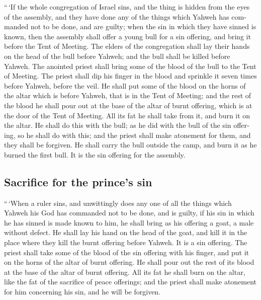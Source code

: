 \begin{paracol}{2}
\begin{otherlanguage}{english}
 ``\,`If the whole congregation of Israel sins, and the
thing is hidden from the eyes of the assembly, and they have done any of
the things which Yahweh has commanded not to be done, and are guilty;
 when the sin in which they have sinned is known, then
the assembly shall offer a young bull for a sin offering, and bring it
before the Tent of Meeting.  The elders of the
congregation shall lay their hands on the head of the bull before
Yahweh; and the bull shall be killed before Yahweh.  The
anointed priest shall bring some of the blood of the bull to the Tent of
Meeting.  The priest shall dip his finger in the blood
and sprinkle it seven times before Yahweh, before the veil.
 He shall put some of the blood on the horns of the altar
which is before Yahweh, that is in the Tent of Meeting; and the rest of
the blood he shall pour out at the base of the altar of burnt offering,
which is at the door of the Tent of Meeting.  All its fat
he shall take from it, and burn it on the altar.  He
shall do this with the bull; as he did with the bull of the sin
offering, so he shall do with this; and the priest shall make atonement
for them, and they shall be forgiven.  He shall carry the
bull outside the camp, and burn it as he burned the first bull. It is
the sin offering for the assembly.

\hypertarget{sacrifice-for-the-princes-sin}{%
\subsection{Sacrifice for the prince's
sin}\label{sacrifice-for-the-princes-sin}}

 ``\,`When a ruler sins, and unwittingly does any one of
all the things which Yahweh his God has commanded not to be done, and is
guilty,  if his sin in which he has sinned is made known
to him, he shall bring as his offering a goat, a male without defect.
 He shall lay his hand on the head of the goat, and kill
it in the place where they kill the burnt offering before Yahweh. It is
a sin offering.  The priest shall take some of the blood
of the sin offering with his finger, and put it on the horns of the
altar of burnt offering. He shall pour out the rest of its blood at the
base of the altar of burnt offering.  All its fat he
shall burn on the altar, like the fat of the sacrifice of peace
offerings; and the priest shall make atonement for him concerning his
sin, and he will be forgiven.


\end{otherlanguage}
\end{paracol}
